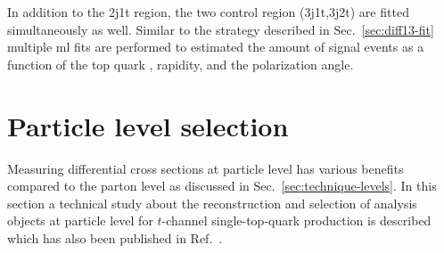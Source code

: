 
In addition to the 2j1t region, the two \ttbar control region (3j1t,3j2t) are fitted simultaneously as well. Similar to the strategy described in Sec.~\ref{sec:diff13-fit} multiple \gls{ml} fits are performed to estimated the amount of signal events as a function of the top quark \pt, rapidity, and the polarization angle.

 

\section{Particle level selection}
\label{sec:prospects-fiducial-studies}

Measuring differential cross sections at particle level has various benefits compared to the parton level as discussed in Sec.~\ref{sec:technique-levels}. In this section a technical study about the reconstruction and selection of analysis objects at particle level for $t$-channel single-top-quark production is described which has also been published in Ref.~\cite{particleStudies}.



